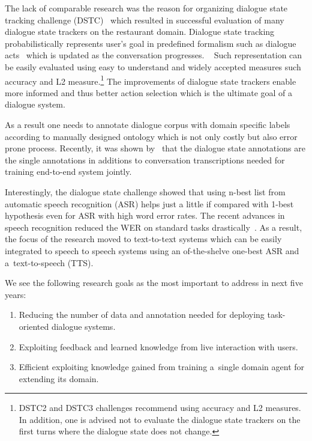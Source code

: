 \documentclass[11pt]{article}
\begin{document}
The lack of comparable research was the reason for organizing dialogue state tracking challenge (DSTC)~\cite{dstcwilliams} which resulted in successful evaluation of many dialogue state trackers on the restaurant domain.
Dialogue state tracking probabilistically represents user's goal in predefined formalism such as dialogue acts~\cite{dstcwilliams,hendersonsecond,hendersonthird} which is updated as the conversation progresses.
~\cite{hendersonthird}
Such representation can be easily evaluated using easy to understand and widely accepted measures such accuracy and L2 measure.\footnote{DSTC2 and DSTC3 challenges recommend using accuracy and L2 measures. In addition, one is advised not to evaluate the dialogue state trackers on the first turns where the dialogue state does not change.}
The improvements of dialogue state trackers enable more informed and thus better action selection which is the ultimate goal of a dialogue system.

As a result one needs to annotate dialogue corpus with domain specific labels according to manually designed ontology which is not only costly but also error prone process.
Recently, it was shown by~\cite{wen_networkbased_2016} that the dialogue state annotations are the single annotations in additions to conversation transcriptions needed for training end-to-end system jointly.

Interestingly, the dialogue state challenge showed that using n-best list from automatic speech recognition (ASR) helps just a little if compared with 1-best hypothesis even for ASR with high word error rates.
The recent advances in speech recognition reduced the WER on standard tasks drastically~\cite{peddinti_jhu_2015,zhang_highway_2016}.
As a result, the focus of the research moved to text-to-text systems which can be easily integrated to speech to speech systems using an of-the-shelve one-best ASR and a~text-to-speech (TTS).

We see the following research goals as the most important to address in next five years:
\begin{enumerate}
    \item Reducing the number of data and annotation needed for deploying task-oriented dialogue systems.
    \item Exploiting feedback and learned knowledge from live interaction with users.
    \item Efficient exploiting knowledge gained from training a~single domain agent for extending its domain. 
\end{enumerate}
\end{document}
